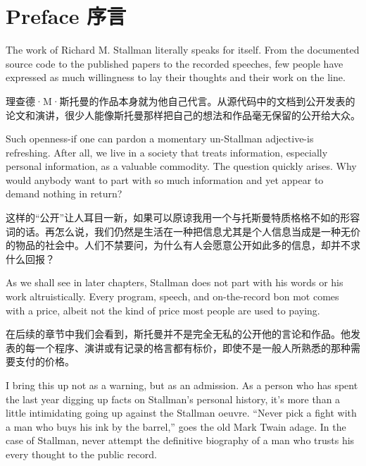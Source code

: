 \chapter{\ifdefined\eng
Preface
\fi
\ifdefined\chs
序言
\fi}

\ifdefined\eng
The work of Richard M. Stallman literally speaks for itself. From the documented source code to the published papers to the recorded speeches, few people have expressed as much willingness to lay their thoughts and their work on the line.
\fi

\ifdefined\chs
理查德·M·斯托曼的作品本身就为他自己代言。从源代码中的文档到公开发表的论文和演讲，很少人能像斯托曼那样把自己的想法和作品毫无保留的公开给大众。
\fi

\ifdefined\eng
Such openness-if one can pardon a momentary un-Stallman adjective-is refreshing. After all, we live in a society that treats information, especially personal information, as a valuable commodity. The question quickly arises. Why would anybody want to part with so much information and yet appear to demand nothing in return?
\fi

\ifdefined\chs
这样的“公开”让人耳目一新，如果可以原谅我用一个与托斯曼特质格格不如的形容词的话。再怎么说，我们仍然是生活在一种把信息尤其是个人信息当成是一种无价的物品的社会中。人们不禁要问，为什么有人会愿意公开如此多的信息，却并不求什么回报？
\fi

\ifdefined\eng
As we shall see in later chapters, Stallman does not part with his words or his work altruistically. Every program, speech, and on-the-record bon mot comes with a price, albeit not the kind of price most people are used to paying.
\fi

\ifdefined\chs
在后续的章节中我们会看到，斯托曼并不是完全无私的公开他的言论和作品。他发表的每一个程序、演讲或有记录的格言都有标价，即使不是一般人所熟悉的那种需要支付的价格。
\fi

\ifdefined\eng
I bring this up not as a warning, but as an admission. As a person who has spent the last year digging up facts on Stallman's personal history, it's more than a little intimidating going up against the Stallman oeuvre. ``Never pick a fight with a man who buys his ink by the barrel,'' goes the old Mark Twain adage. In the case of Stallman, never attempt the definitive biography of a man who trusts his every thought to the public record.
\fi

